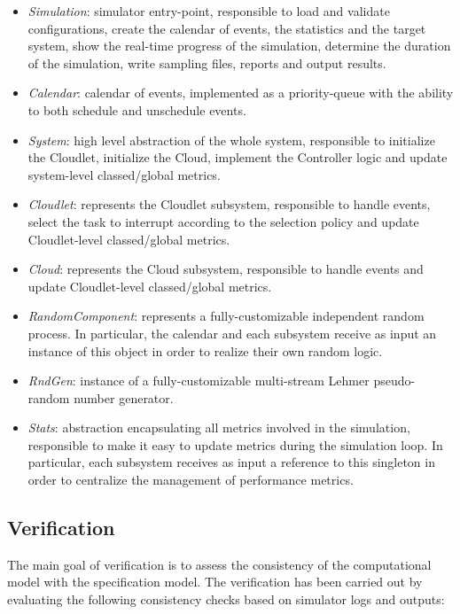 \begin{itemize}

	\item \textit{Simulation}: simulator entry-point, responsible to load and validate configurations, create the calendar of events, the statistics and the target system, show the real-time progress of the simulation, determine the duration of the simulation, write sampling files, reports and output results.
	
	\item \textit{Calendar}: calendar of events, implemented as a priority-queue with the ability to both schedule and unschedule events.
	
	\item \textit{System}: high level abstraction of the whole system, responsible to initialize the Cloudlet, initialize the Cloud, implement the Controller logic and update system-level classed/global metrics.
	
	\item \textit{Cloudlet}: represents the Cloudlet subsystem, responsible to handle events, select the task to interrupt according to the selection policy and update Cloudlet-level classed/global metrics.
	
	\item \textit{Cloud}: represents the Cloud subsystem, responsible to handle events and update Cloudlet-level classed/global metrics.
	
	\item \textit{RandomComponent}: represents a fully-customizable independent random process. In particular, the calendar and each subsystem receive as input an instance of this object in order to realize their own random logic.
	
	\item \textit{RndGen}: instance of a fully-customizable multi-stream Lehmer pseudo-random number generator.
	
	\item \textit{Stats}: abstraction encapsulating all metrics involved in the simulation, responsible to make it easy to update metrics during the simulation loop. In particular, each subsystem receives as input a reference to this singleton in order to centralize the management of performance metrics.
\end{itemize}


\subsection{Verification}
The main goal of verification is to assess the consistency of the computational model with the specification model.
The verification has been carried out by evaluating the following consistency checks based on simulator logs and outputs:

